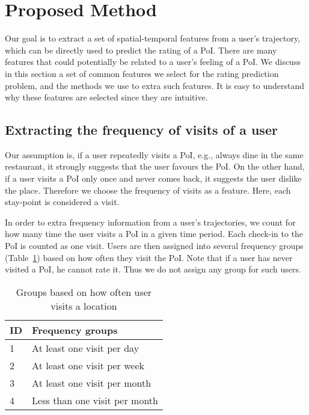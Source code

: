 \section{Proposed Method}\label{sec:method}

Our goal is to extract a set of spatial-temporal features from a user's trajectory, which can be directly used to predict the rating of a PoI. There are many features that could potentially be related to a user's feeling of a PoI. We discuss in this section a set of common features we select for the rating prediction problem, and the methods we use to extra such features. It is easy to understand why these features are selected since they are intuitive.

\subsection{Extracting the frequency of visits of a user}

Our assumption is, if a user repeatedly visits a PoI, e.g., always dine in the same restaurant, it strongly suggests that the user favours the PoI. On the other hand, if a user visits a PoI only once and never comes back, it suggests the user dislike the place. Therefore we choose the frequency of visits as a feature. Here, each stay-point is considered a visit.

In order to extra frequency information from a user's trajectories, we count for how many time the user visits a PoI in a given time period. Each check-in to the PoI is counted as one visit. Users are then assigned into several frequency groups (Table~\ref{frequencyGroups}) based on how often they visit the PoI. Note that if a user has never visited a PoI, he cannot rate it. Thus we do not assign any group for such users.

\begin{table}[htbp]
\begin{center}
\caption{Groups based on how often user visits a location \label{frequencyGroups}}
\begin{tabular}{|l|l|} \hline
ID & \textbf{Frequency groups} \\ \hline
1 & At least one visit per day \\ \hline
2 & At least one visit per week \\ \hline
3 & At least one visit per month \\ \hline
4 & Less than one visit per month \\ \hline
\end{tabular}
\end{center}
\end{table}

